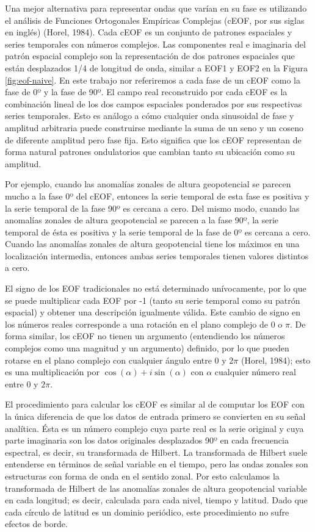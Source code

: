 \documentclass[12pt,oneside]{reedthesis}
\begin{document}
Una mejor alternativa para representar ondas que varían en su fase es utilizando el análisis de Funciones Ortogonales Empíricas Complejas (cEOF, por sus siglas en inglés) (Horel, 1984).
Cada cEOF es un conjunto de patrones espaciales y series temporales con números complejos.
Las componentes real e imaginaria del patrón espacial complejo son la representación de dos patrones espaciales que están desplazados 1/4 de longitud de onda, similar a EOF1 y EOF2 en la Figura \ref{fig:eof-naive}.
En este trabajo nor referiremos a cada fase de un cEOF como la fase de 0º y la fase de 90º.
El campo real reconstruido por cada cEOF es la combinación lineal de los dos campos espaciales ponderados por sus respectivas series temporales.
Esto es análogo a cómo cualquier onda sinusoidal de fase y amplitud arbitraria puede construirse mediante la suma de un seno y un coseno de diferente amplitud pero fase fija.
Esto significa que los cEOF representan de forma natural patrones ondulatorios que cambian tanto su ubicación como su amplitud.

Por ejemplo, cuando las anomalías zonales de altura geopotencial se parecen mucho a la fase 0º del cEOF, entonces la serie temporal de esta fase es positiva y la serie temporal de la fase 90º es cercana a cero.
Del mismo modo, cuando las anomalías zonales de altura geopotencial se parecen a la fase 90º, la serie temporal de ésta es positiva y la serie temporal de la fase de 0º es cercana a cero.
Cuando las anomalías zonales de altura geopotencial tiene los máximos en una localización intermedia, entonces ambas series temporales tienen valores distintos a cero.

El signo de los EOF tradicionales no está determinado unívocamente, por lo que se puede multiplicar cada EOF por -1 (tanto su serie temporal como su patrón espacial) y obtener una descripción igualmente válida.
Este cambio de signo en los números reales corresponde a una rotación en el plano complejo de 0 o \(\pi\).
De forma similar, los cEOF no tienen un argumento (entendiendo los números complejos como una magnitud y un argumento) definido, por lo que pueden rotarse en el plano complejo con cualquier ángulo entre 0 y \(2\pi\) (Horel, 1984); esto es una multiplicación por \(\cos(\alpha) + i\sin(\alpha)\) con \(\alpha\) cualquier número real entre 0 y \(2\pi\).

El procedimiento para calcular los cEOF es similar al de computar los EOF con la única diferencia de que los datos de entrada primero se convierten en su señal analítica.
Ésta es un número complejo cuya parte real es la serie original y cuya parte imaginaria son los datos originales desplazados 90º en cada frecuencia espectral, es decir, su transformada de Hilbert.
La transformada de Hilbert suele entenderse en términos de señal variable en el tiempo, pero las ondas zonales son estructuras con forma de onda en el sentido zonal.
Por esto calculamos la transformada de Hilbert de las anomalías zonales de altura geopotencial variable en cada longitud; es decir, calculada para cada nivel, tiempo y latitud.
Dado que cada círculo de latitud es un dominio periódico, este procedimiento no sufre efectos de borde.
\end{document}
